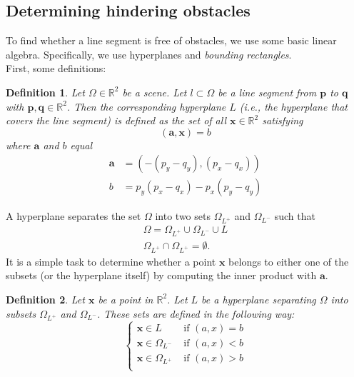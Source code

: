 \documentclass{article}
\renewcommand{\vec}[1]{\mathbf{#1}}
\newtheorem{newdef}{Definition}
\begin{document}
\subsection{Determining hindering obstacles}
\label{sec:crosses_obstacle}
To find whether a line segment is free of obstacles, we use some basic linear algebra. Specifically, we use hyperplanes and \emph{bounding rectangles}. 
\ \\
First, some definitions:
\begin{newdef}
	Let $\Omega \in \mathbb{R}^2$ be a scene.
	Let $l\subset \Omega$ be a line segment from $\vec{p}$ to $\vec{q}$ with $\vec{p},\vec{q} \in \mathbb{R}^2$. Then the corresponding hyperplane $L$ (i.e., the hyperplane that covers the line segment) is defined as the set of all $\vec{x}\in\mathbb{R}^2$ satisfying
	\begin{equation}
		(\vec{a},\vec{x})=b
	\end{equation}
	where $\vec{a}$ and $b$ equal 
	\begin{align}
		\vec{a} &= \left( -(p_y-q_y),(p_x-q_x)\right)\\
		b   &=  p_y(p_x - q_x) - p_x(p_y - q_y)
	\end{align}
\end{newdef}
\noindent
A hyperplane separates the set $\Omega$ into two sets $\Omega_{L^+}$ and $\Omega_{L^-}$ such that
\begin{align}
\Omega = \Omega_{L^+} \cup \Omega_{L^-} \cup L\\
\Omega_{L^+}\cap\Omega_{L^+}=\emptyset.
	\label{def:hyp}
\end{align}
It is a simple task to determine whether a point $\vec{x}$ belongs to either one of the subsets (or the hyperplane itself) by computing the inner product with $\vec{a}$.
\begin{newdef}
	Let $\vec{x}$ be a point in $\mathbb{R}^2$. Let $L$ be a hyperplane separating $\Omega$ into subsets $\Omega_{L^+}$ and $\Omega_{L^-}$. These sets are defined in the following way:
	\begin{equation}
		\begin{cases}
			\vec{x} \in L&\mbox{ if }(a,x) = b\\
			\vec{x}  \in \Omega_{L^-} &\mbox{ if }(a,x) < b\\
			\vec{x}  \in \Omega_{L^+} &\mbox{ if }(a,x) > b\\
		\end{cases}
		\label{eq:separation}
	\end{equation}
\end{newdef}
\end{document}
